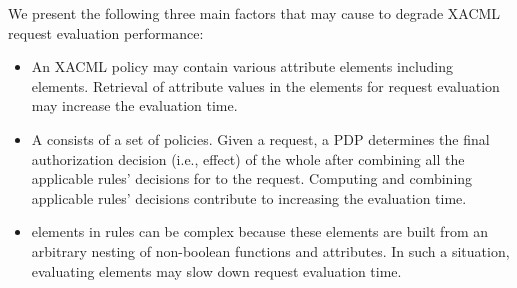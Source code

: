 We present the following three main factors that may cause to degrade XACML request evaluation performance: 

\begin{itemize}
\item An XACML policy may contain various attribute elements including  elements. Retrieval of
attribute values in the  elements for request evaluation may increase the evaluation time.
\item A  consists of a set of policies. Given a request, a PDP determines the final authorization decision (i.e., effect) of 
the whole  after combining all the applicable rules' decisions for to the request.
Computing and combining applicable rules' decisions contribute to increasing the evaluation time.
\item {} elements in rules can be complex because these elements are built from an arbitrary nesting of non-boolean functions and attributes. 
In such a situation, evaluating  elements may slow down request evaluation time.
\end{itemize}

